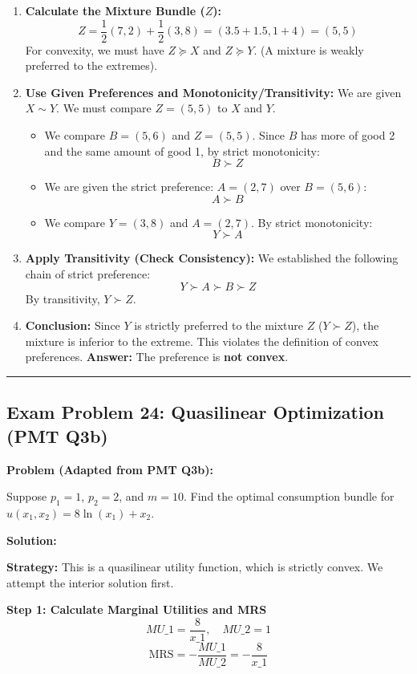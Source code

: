 \documentclass{article}
\begin{document}
\begin{enumerate}
\item \textbf{Calculate the Mixture Bundle ($Z$):} \[ Z = \frac{1}{2}(7, 2) + \frac{1}{2}(3, 8) = (3.5 + 1.5, 1 + 4) = (5, 5) \] For convexity, we must have $Z \succeq X$ and $Z \succeq Y$. (A mixture is weakly preferred to the extremes).
\item \textbf{Use Given Preferences and Monotonicity/Transitivity:} We are given $X \sim Y$. We must compare $Z=(5, 5)$ to $X$ and $Y$.
\begin{itemize}
\item We compare $B=(5, 6)$ and $Z=(5, 5)$. Since $B$ has more of good 2 and the same amount of good 1, by strict monotonicity: \[ B \succ Z \]
\item We are given the strict preference: $A=(2, 7)$ over $B=(5, 6)$: \[ A \succ B \]
\item We compare $Y=(3, 8)$ and $A=(2, 7)$. By strict monotonicity: \[ Y \succ A \]
\end{itemize}
\item \textbf{Apply Transitivity (Check Consistency):} We established the following chain of strict preference: \[ Y \succ A \succ B \succ Z \] By transitivity, $Y \succ Z$.
\item \textbf{Conclusion:} Since $Y$ is strictly preferred to the mixture $Z$ ($Y \succ Z$), the mixture is inferior to the extreme. This violates the definition of convex preferences. \textbf{Answer:} The preference is \textbf{not convex}.
\end{enumerate}

\vspace{1em}\hrule\vspace{1em}

\subsection*{Exam Problem 24: Quasilinear Optimization (PMT Q3b)}

\textbf{Problem (Adapted from PMT Q3b):}

Suppose $p_1=1$, $p_2=2$, and $m=10$. Find the optimal consumption bundle for $u(x_1, x_2) = 8 \ln(x_1) + x_2$.

\textbf{Solution:}

\textbf{Strategy:} This is a quasilinear utility function, which is strictly convex. We attempt the interior solution first.

\textbf{Step 1: Calculate Marginal Utilities and MRS}
\[ MU\_1 = \frac{8}{x\_1}, \quad MU\_2 = 1 \]
\[ \text{MRS} = -\frac{MU\_1}{MU\_2} = -\frac{8}{x\_1} \]
\end{document}
